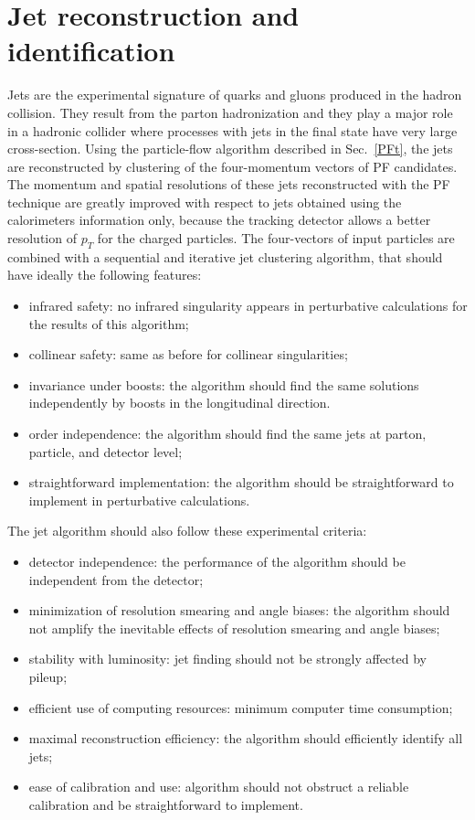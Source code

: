 \section{Jet reconstruction and identification}
\label{jetr}
Jets are the experimental signature of quarks and gluons produced in the hadron collision. They result from the parton  hadronization and they play a major role in a hadronic collider where processes with jets in the final state have very large cross-section. %
Using the particle-flow algorithm described in Sec.~\ref{PFt}, the  jets are reconstructed by clustering of the  four-momentum vectors of PF candidates.%
The momentum and spatial resolutions of these jets reconstructed with the PF technique are greatly improved with respect to jets obtained using the calorimeters information only, because the tracking detector allows a better resolution of $p_T$ for the charged particles.
The four-vectors of input particles are combined with a sequential and iterative jet clustering algorithm, that should have ideally the following features:
\begin{itemize}
\item infrared safety: no infrared singularity appears in perturbative calculations for the results of this algorithm;
\item collinear safety: same as before for collinear singularities;
\item invariance under boosts: the algorithm should find the same solutions independently
by boosts in the longitudinal direction.
\item order independence: the algorithm should find the same jets at parton, particle, and detector level;
\item straightforward implementation: the algorithm should be straightforward to implement in perturbative calculations.
\end{itemize}
The jet algorithm should also follow these  experimental criteria:
\begin{itemize}
\item detector independence: the performance of the algorithm should be independent from the detector;
\item minimization of resolution smearing and angle biases: the algorithm should not
amplify the inevitable effects of resolution smearing and angle biases;
\item stability with luminosity: jet finding should not be strongly affected by pileup;
\item efficient use of computing resources: minimum  computer time consumption;
\item maximal reconstruction efficiency: the algorithm should efficiently identify all jets;
\item ease of calibration and use: algorithm should not obstruct a reliable calibration and be straightforward to implement.
\end{itemize}
